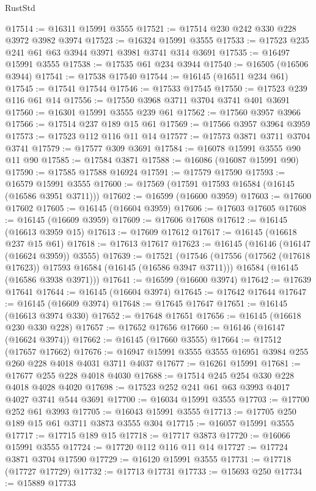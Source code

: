 \begin{lexlean}{RustStd}
\begin{coremodule}
{\begin{coremodule}
{{{{{{{{{{{{{{{{{{{{{{{{{{{{{{{{{{{{{{{{{{{{{{{@17514 := @16311 @15991 @3555
@17521 := @17514 @230 @242 @330 @228 @3972 @3982 @3974
@17523 := @16324 @15991 @3555
@17533 := @17523 @235 @241 @61 @63 @3944 @3971 @3981 @3741 @314 @3691
@17535 := @16497 @15991 @3555
@17538 := @17535 @61 @234 @3944
@17540 := @16505 (@16506 @3944)
@17541 := @17538 @17540
@17544 := @16145 (@16511 @234 @61)
@17545 := @17541 @17544
@17546 := @17533 @17545
@17550 := @17523 @239 @116 @61 @14
@17556 := @17550 @3968 @3711 @3704 @3741 @401 @3691
@17560 := @16301 @15991 @3555 @239 @61
@17562 := @17560 @3957 @3966
@17566 := @17514 @237 @189 @15 @61
@17569 := @17566 @3957 @3964 @3959
@17573 := @17523 @112 @116 @11 @14
@17577 := @17573 @3871 @3711 @3704 @3741
@17579 := @17577 @309 @3691
@17584 := @16078 @15991 @3555 @90 @11 @90
@17585 := @17584 @3871
@17588 := @16086 (@16087 @15991 @90)
@17590 := @17585 @17588 @16924
@17591 := @17579 @17590
@17593 := @16579 @15991 @3555
@17600 := @17569 (@17591 @17593 @16584 (@16145 (@16586 @3951 @3711)))
@17602 := @16599 (@16600 @3959)
@17603 := @17600 @17602
@17605 := @16145 (@16604 @3959)
@17606 := @17603 @17605
@17608 := @16145 (@16609 @3959)
@17609 := @17606 @17608
@17612 := @16145 (@16613 @3959 @15)
@17613 := @17609 @17612
@17617 := @16145 (@16618 @237 @15 @61)
@17618 := @17613 @17617
@17623 := @16145 (@16146 (@16147 (@16624 @3959)) @3555)
@17639 := @17521
    (@17546
      (@17556 (@17562 (@17618 @17623)) @17593 @16584 (@16145 (@16586 @3947 @3711)))
      @16584
      (@16145 (@16586 @3938 @3971)))
@17641 := @16599 (@16600 @3974)
@17642 := @17639 @17641
@17644 := @16145 (@16604 @3974)
@17645 := @17642 @17644
@17647 := @16145 (@16609 @3974)
@17648 := @17645 @17647
@17651 := @16145 (@16613 @3974 @330)
@17652 := @17648 @17651
@17656 := @16145 (@16618 @230 @330 @228)
@17657 := @17652 @17656
@17660 := @16146 (@16147 (@16624 @3974))
@17662 := @16145 (@17660 @3555)
@17664 := @17512 (@17657 @17662)
@17676 := @16947 @15991 @3555 @3555 @16951 @3984 @255 @260 @228 @4018 @4031 @3711 @4037
@17677 := @16261 @15991
@17681 := @17677 @255 @228 @4018 @4030
@17688 := @17514 @245 @254 @330 @228 @4018 @4028 @4020
@17698 := @17523 @252 @241 @61 @63 @3993 @4017 @4027 @3741 @544 @3691
@17700 := @16034 @15991 @3555
@17703 := @17700 @252 @61 @3993
@17705 := @16043 @15991 @3555
@17713 := @17705 @250 @189 @15 @61 @3711 @3873 @3555 @304
@17715 := @16057 @15991 @3555
@17717 := @17715 @189 @15
@17718 := @17717 @3873
@17720 := @16066 @15991 @3555
@17724 := @17720 @112 @116 @11 @14
@17727 := @17724 @3871 @3704 @17590
@17729 := @16120 @15991 @3555
@17731 := @17718 (@17727 @17729)
@17732 := @17713 @17731
@17733 := @15693 @250
@17734 := @15889 @17733
}}}}}}}}}}}}}}}}}}}}}}}}}}}}}}}}}}}}}}}}}}}}}}}
\end{coremodule}}
\end{coremodule}
\end{lexlean}
